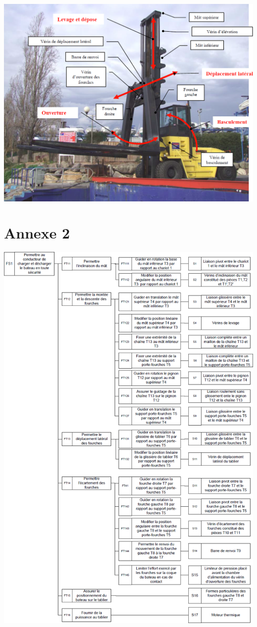 \documentclass[10pt,fleqn]{article} %
\begin{document}
\begin{center}
\includegraphics[width=1.\linewidth]{images/ann_01}
\end{center}

\newpage
\section*{Annexe 2}

\begin{center}
\includegraphics[width=.9\linewidth]{images/ann_02}
\end{center}
\end{document}
